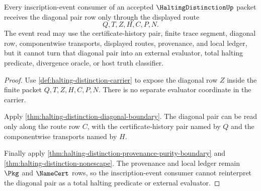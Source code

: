 \begin{theorem}
\label{thm:halting-distinction-inscription-event-handoff}
Every inscription-event consumer of an accepted $\HaltingDistinctionUp$ packet receives the diagonal pair row only through the displayed route
$$
Q,T,Z,H,C,P,N.
$$
The event read may use the certificate-history pair, finite trace segment, diagonal row, componentwise transports, displayed routes, provenance, and local ledger, but it cannot turn that diagonal pair into an external evaluator, total halting predicate, divergence oracle, or host truth classifier.
\end{theorem}
\begin{proof}
Use \autoref{def:halting-distinction-carrier} to expose the diagonal row $Z$ inside the finite packet $Q,T,Z,H,C,P,N$. There is no separate evaluator coordinate in the carrier.

Apply \autoref{thm:halting-distinction-diagonal-boundary}. The diagonal pair can be read only along the route row $C$, with the certificate-history pair named by $Q$ and the componentwise transports named by $H$.

Finally apply \autoref{thm:halting-distinction-provenance-purity-boundary} and \autoref{thm:halting-distinction-nonescape}. The provenance and local ledger remain $\Pkg$ and $\NameCert$ rows, so the inscription-event consumer cannot reinterpret the diagonal pair as a total halting predicate or external evaluator.
\end{proof}

